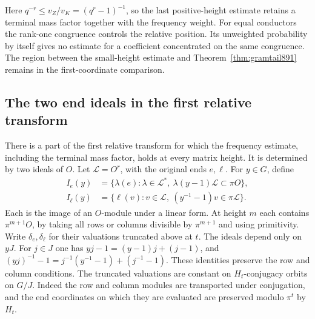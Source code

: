 \documentclass[a4paper,11pt]{article}
\theoremstyle{definition}
\theoremstyle{remark}
\numberwithin{equation}{section}
\begin{document}
Here \(q^{-r}\le v_Z/v_K=(q^r-1)^{-1}\), so the last positive-height
estimate retains a terminal mass factor together with the frequency
weight. For equal conductors the rank-one congruence controls the
relative position. Its unweighted probability by itself gives
no estimate for a coefficient concentrated on the same congruence.
The region between the small-height estimate and
Theorem~\ref{thm:gramtail891} remains in the first-coordinate
comparison.
\clearpage

\subsection{The two end ideals in the first relative transform}
\label{sec:endtransform894}

There is a part of the first relative transform for which the
frequency estimate, including the terminal mass factor, holds
at every matrix height. It is determined by two ideals of \(O\).
Let \(\mathcal L=O^r\), with the original ends \(e,\ell\). For
\(y\in G\), define
\begin{align*}
 I_e(y)&=\{\lambda(e):\lambda\in\mathcal L^*,\
                             \lambda(y-1)\mathcal L\subset\pi O\},\\
 I_\ell(y)&=\{\ell(v):v\in\mathcal L,\
                             (y^{-1}-1)v\in\pi\mathcal L\}.
\end{align*}
Each is the image of an \(O\)-module under a linear form. At height
\(m\) each contains \(\pi^{m+1}O\), by taking all rows or columns
divisible by \(\pi^{m+1}\) and using primitivity. Write
\(\delta_e,\delta_\ell\) for their valuations truncated above at \(t\).
The ideals depend only on \(yJ\). For \(j\in J\) one has
\(yj-1=(y-1)j+(j-1)\), and
\((yj)^{-1}-1=j^{-1}(y^{-1}-1)+(j^{-1}-1)\). These identities
preserve the row and column conditions. The truncated valuations
are constant on \(H_t\)-conjugacy orbits on \(G/J\). Indeed the
row and column modules are transported under conjugation, and
the end coordinates on which they are evaluated are preserved
modulo \(\pi^t\) by \(H_t\).
\end{document}
